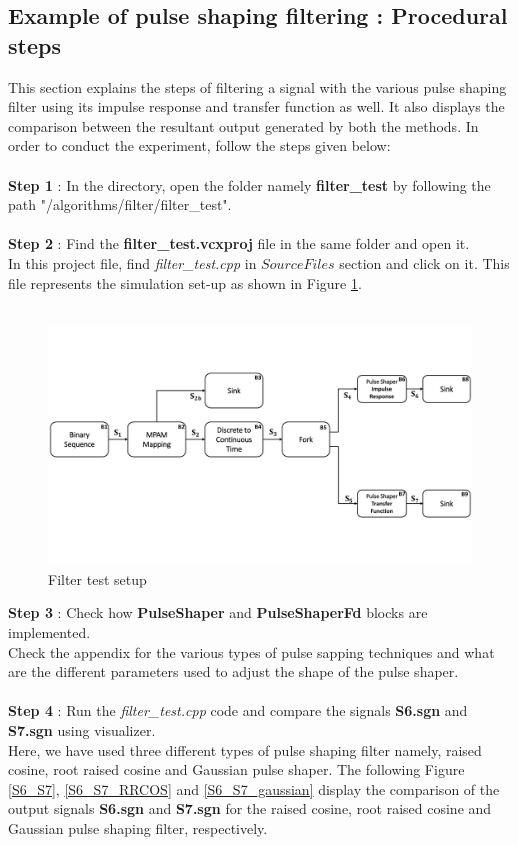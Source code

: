 \subsection*{Example of pulse shaping filtering : Procedural steps}
This section explains the steps of filtering a signal with the various pulse shaping filter using its impulse response and transfer function as well. It also displays the comparison between the resultant output generated by both the methods. In order to conduct the experiment, follow the steps given below:\\ \\
\textbf{Step 1} : In the directory, open the folder namely \textbf{filter\_test} by following the path  "/algorithms/filter/filter\_test".\\ \\
\textbf{Step 2} : Find the \textbf{filter\_test.vcxproj} file in the same folder and open it.\\
In this project file, find \textit{filter\_test.cpp} in $Source Files$ section and click on it. This file represents the simulation set-up as shown in Figure \ref{FilterTest}. \\ \\
\begin{figure}[h]
	\centering
	\includegraphics[width=16cm]{./algorithms/filter/figures/Test_Filter_Dia.pdf}
	\caption{Filter test setup}
	\label{FilterTest}
\end{figure}
\textbf{Step 3} : Check how \textbf{PulseShaper} and  \textbf{PulseShaperFd} blocks are implemented.\\
Check the appendix for the various types of pulse sapping techniques and what are the different parameters used to adjust the shape of the pulse shaper.\\ \\
%
\textbf{Step 4} : Run the \textit{filter\_test.cpp} code and compare the  signals \textbf{S6.sgn} and \textbf{S7.sgn} using visualizer.\\
Here, we have used three different types of pulse shaping filter namely, raised cosine, root raised cosine and Gaussian pulse shaper. The following Figure \ref{S6_S7}, \ref{S6_S7_RRCOS}  and \ref{S6_S7_gaussian} display the comparison of the output signals \textbf{S6.sgn} and \textbf{S7.sgn} for the raised cosine, root raised cosine and Gaussian pulse shaping filter, respectively. 

